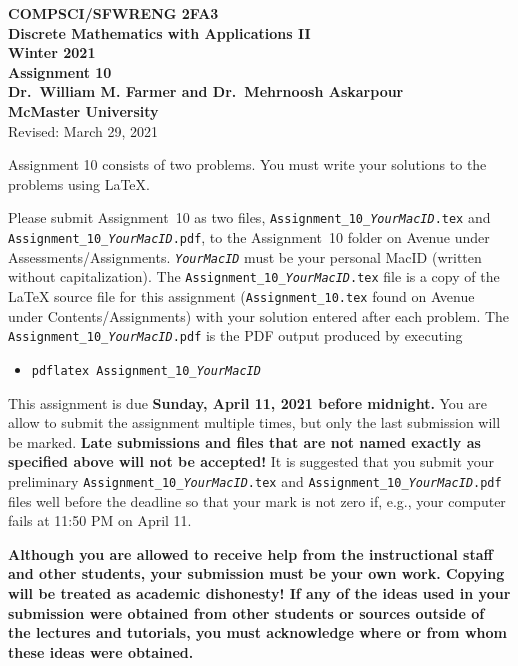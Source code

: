 \documentclass[11pt,fleqn]{article}
\begin{document}
\begin{center}

{\large \textbf{COMPSCI/SFWRENG 2FA3}}\\[2mm]
{\large \textbf{Discrete Mathematics with Applications II}}\\[2mm]
{\large \textbf{Winter 2021}}\\[8mm]
{\huge \textbf{Assignment 10}}\\[6mm]
{\large \textbf{Dr.~William M. Farmer and Dr.~Mehrnoosh Askarpour}}\\[2mm]
{\large \textbf{McMaster University}}\\[6mm]
{\large Revised: March 29, 2021}

\end{center}

\medskip

Assignment 10 consists of two problems.  You must write your solutions
to the problems using LaTeX.

Please submit Assignment~10 as two files,
\texttt{Assignment\_10\_\emph{YourMacID}.tex} and
\texttt{Assignment\_10\_\emph{YourMacID}.pdf}, to the Assignment~10
folder on Avenue under Assessments/Assignments.
\texttt{\emph{YourMacID}} must be your personal MacID (written without
capitalization).  The \texttt{Assignment\_10\_\emph{YourMacID}.tex}
file is a copy of the LaTeX source file for this assignment
(\texttt{Assignment\_10.tex} found on Avenue under
Contents/Assignments) with your solution entered after each problem.
The \texttt{Assignment\_10\_\emph{YourMacID}.pdf} is the PDF output
produced by executing

\begin{itemize}

  \item[] \texttt{pdflatex Assignment\_10\_\emph{YourMacID}}

\end{itemize}

This assignment is due \textbf{Sunday, April 11, 2021 before
  midnight.}  You are allow to submit the assignment multiple times,
but only the last submission will be marked.  \textbf{Late submissions
  and files that are not named exactly as specified above will not be
  accepted!}  It is suggested that you submit your preliminary
\texttt{Assignment\_10\_\emph{YourMacID}.tex} and
\texttt{Assignment\_10\_\emph{YourMacID}.pdf} files well before the
deadline so that your mark is not zero if, e.g., your computer fails
at 11:50 PM on April 11.

\textbf{Although you are allowed to receive help from the
  instructional staff and other students, your submission must be your
  own work.  Copying will be treated as academic dishonesty! If any of
  the ideas used in your submission were obtained from other students
  or sources outside of the lectures and tutorials, you must
  acknowledge where or from whom these ideas were obtained.}
\end{document}
